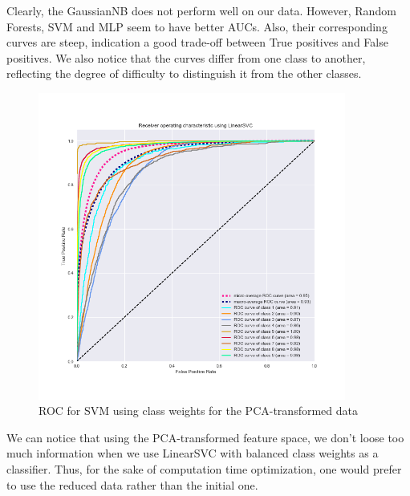\documentclass[a4paper,english,12pt]{article}
\begin{document}
Clearly, the GaussianNB does not perform well on our data. However, Random Forests, SVM and MLP seem to have better AUCs. Also, their corresponding curves are steep, indication a good trade-off between True positives and False positives. We also notice that the curves differ from one class to another, reflecting the degree of difficulty to distinguish it from the other classes. 

\begin{figure}[H]
	\centering
	\includegraphics[width=0.9\textwidth,keepaspectratio]{ROC_OvR_LinearSVC_using_PCA}
	\caption{ROC for SVM using class weights for the PCA-transformed data}
\end{figure}

We can notice that using the PCA-transformed feature space, we don't loose too much information when we use LinearSVC with balanced class weights as a classifier. Thus, for the sake of computation time optimization, one would prefer to use the reduced data rather than the initial one.
\end{document}
